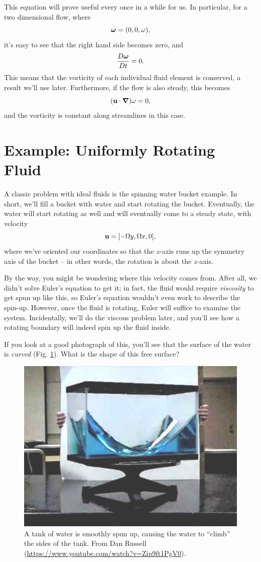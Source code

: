This equation will prove useful every once in a while for us.  In particular, for a two dimensional flow, where 
\[
\boldsymbol{\omega} = (0,0,\omega),
\]
it's easy to see that the right hand side becomes zero, and 
\begin{equation}
\frac{D \boldsymbol{\omega}}{Dt} = 0.
\end{equation}
This means that the vorticity of each individual fluid element is conserved, a result we'll use later.  Furthermore, if the flow is also steady, this becomes
\begin{equation}
(\mathbf{u} \cdot \boldsymbol{\nabla}) \omega = 0,
\end{equation}
and the vorticity is constant along streamlines in this case.







\section{Example: Uniformly Rotating Fluid}

A classic problem with ideal fluids is the spinning water bucket example.  In short, we'll fill a bucket with water and start rotating the bucket.  Eventually, the water will start rotating as well and will eventually come to a steady state, with velocity
\begin{equation}
\label{eq_bucket_vel}
\mathbf{u} = [-\Omega y, \Omega x, 0],
\end{equation}
where we've oriented our coordinates so that the $z$-axis runs up the symmetry axis of the bucket -- in other words, the rotation is about the $z$-axis.

By the way, you might be wondering where this velocity comes from.  After all, we didn't solve Euler's equation to get it; in fact, the fluid would require \emph{viscosity} to get spun up like this, so Euler's equation wouldn't even work to describe the spin-up.  However, once the fluid is rotating, Euler will suffice to examine the system.  Incidentally, we'll do the viscous problem later, and you'll see how a rotating boundary will indeed spin up the fluid inside.

If you look at a good photograph of this, you'll see that the surface of the water is \emph{curved} (Fig. \ref{fig_bucket}).  What is the shape of this free surface?

\begin{figure}[t]
\centering\includegraphics[width=0.5\linewidth]{Figures/Chapter3/fig_water_bucket.jpg}
\caption{A tank of water is smoothly spun up, causing the water to ``climb'' the sides of the tank.  From Dan Russell (\url{https://www.youtube.com/watch?v=Zip9ft1PgV0}).}
\label{fig_bucket}
\end{figure}

